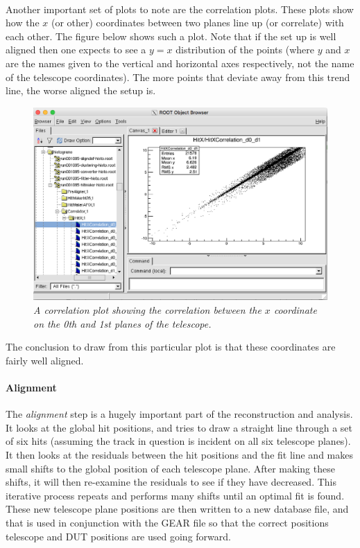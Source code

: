 \documentclass[11pt]{article}
\begin{document}
\paragraph{}
Another important set of plots to note are the correlation plots. These plots show how the $x$ (or other) coordinates between two planes line up (or correlate) with each other. The figure below shows such a plot. Note that if the set up is well aligned then one expects to see a $y=x$ distribution of the points (where $y$ and $x$ are the names given to the vertical and horizontal axes respectively, not the name of the telescope coordinates). The more points that deviate away from this trend line, the worse aligned the setup is.
\begin{figure}[!ht]
	\centering
	\includegraphics[scale=0.4]{hitmaker_corr.png}
	\caption{\textit{A correlation plot showing the correlation between the $x$ coordinate on the 0th and 1st planes of the telescope.}}
\end{figure}
The conclusion to draw from this particular plot is that these coordinates are fairly well aligned.
\paragraph{Alignment}
The \textit{alignment} step is a hugely important part of the reconstruction and analysis. It looks at the global hit positions, and tries to draw a straight line through a set of six hits (assuming the track in question is incident on all six telescope planes). It then looks at the residuals between the hit positions and the fit line and makes small shifts to the global position of each telescope plane. After making these shifts, it will then re-examine the residuals to see if they have decreased. This iterative process repeats and performs many shifts until an optimal fit is found. These new telescope plane positions are then written to a new database file, and that is used in conjunction with the GEAR file so that the correct positions telescope and DUT positions are used going forward.
\end{document}
